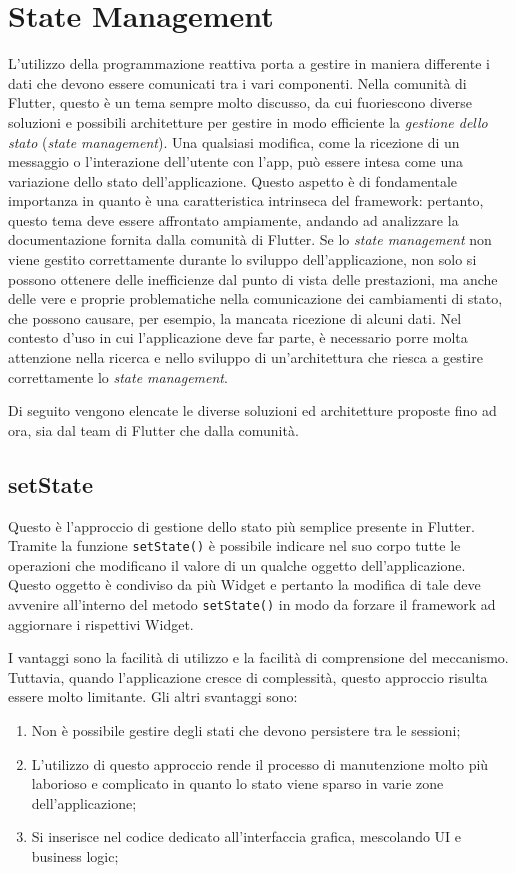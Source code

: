 \section{State Management}
L'utilizzo della programmazione reattiva porta a gestire in maniera differente i dati che devono essere comunicati tra i vari componenti. Nella comunità di Flutter, questo è un tema sempre molto discusso, da cui fuoriescono diverse soluzioni e possibili architetture per gestire in modo efficiente la \textit{gestione dello stato} (\textit{state management}). Una qualsiasi modifica, come la ricezione di un messaggio o l'interazione dell'utente con l'app, può essere intesa come una variazione dello stato dell'applicazione. Questo aspetto è di fondamentale importanza in quanto è una caratteristica intrinseca del framework: pertanto, questo tema deve essere affrontato ampiamente, andando ad analizzare la documentazione fornita dalla comunità di Flutter. Se lo \textit{state management} non viene gestito correttamente durante lo sviluppo dell'applicazione, non solo si possono ottenere delle inefficienze dal punto di vista delle prestazioni, ma anche delle vere e proprie problematiche nella comunicazione dei cambiamenti di stato, che possono causare, per esempio, la mancata ricezione di alcuni dati. Nel contesto d'uso in cui l'applicazione deve far parte, è necessario porre molta attenzione nella ricerca e nello sviluppo di un'architettura che riesca a gestire correttamente lo \textit{state management}.

Di seguito vengono elencate le diverse soluzioni ed architetture proposte fino ad ora, sia dal team di Flutter che dalla comunità.

\subsection{setState}
Questo è l'approccio di gestione dello stato più semplice presente in Flutter. Tramite la funzione \verb|setState()| è possibile indicare nel suo corpo tutte le operazioni che modificano il valore di un qualche oggetto dell'applicazione. Questo oggetto è condiviso da più Widget e pertanto la modifica di tale deve avvenire all'interno del metodo \verb|setState()| in modo da forzare il framework ad aggiornare i rispettivi Widget.

I vantaggi sono la facilità di utilizzo e la facilità di comprensione del meccanismo. Tuttavia, quando l'applicazione cresce di complessità, questo approccio risulta essere molto limitante. Gli altri svantaggi sono:
\begin{enumerate}
	\item Non è possibile gestire degli stati che devono persistere tra le sessioni;
	\item L'utilizzo di questo approccio rende il processo di manutenzione molto più laborioso e complicato in quanto lo stato viene sparso in varie zone dell'applicazione;
	\item Si inserisce nel codice dedicato all'interfaccia grafica, mescolando UI e business logic;
\end{enumerate}

